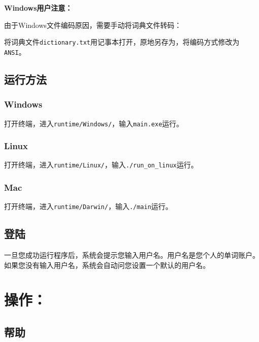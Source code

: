\textbf{Windows用户注意：}

由于Windows文件编码原因，需要手动将词典文件转码：

将词典文件\texttt{dictionary.txt}用记事本打开，原地另存为，将编码方式修改为\texttt{ANSI}。

\section{运行方法}
\label{}

\subsection{Windows}
\label{windows}

打开终端，进入\texttt{runtime\slash Windows\slash }，输入\texttt{main.exe}运行。

\subsection{Linux}
\label{linux}

打开终端，进入\texttt{runtime\slash Linux\slash }，输入\texttt{.\slash run\_on\_linux}运行。

\subsection{Mac}
\label{mac}

打开终端，进入\texttt{runtime\slash Darwin\slash }，输入\texttt{.\slash main}运行。

\section{登陆}
\label{}

一旦您成功运行程序后，系统会提示您输入用户名。用户名是您个人的单词账户。如果您没有输入用户名，系统会自动问您设置一个默认的用户名。

\chapter{操作：}
\label{}

\section{帮助}
\label{}

